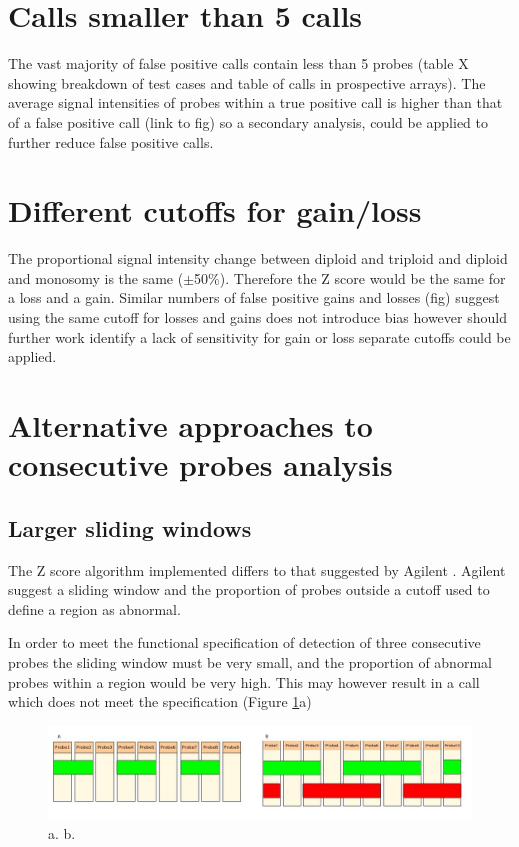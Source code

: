 \section{Calls smaller than 5 calls}
The vast majority of false positive calls contain less than 5 probes (table X showing breakdown of test cases and table of calls in prospective arrays). The average signal intensities of probes within a true positive call is higher than that of a false positive call (link to fig) so a secondary analysis, could be applied to further reduce false positive calls. 


\section{Different cutoffs for gain/loss}
The proportional signal intensity change between diploid and triploid and diploid and monosomy is the same ($\pm$50\%). Therefore the Z score would be the same for a loss and a gain. 
Similar numbers of false positive gains and losses (fig) suggest using the same cutoff for losses and gains does not introduce bias however should further work identify a lack of sensitivity for gain or loss separate cutoffs could be applied.

\section{Alternative approaches to consecutive probes analysis}
\subsection{Larger sliding windows}
The Z score algorithm implemented differs to that suggested by Agilent \cite{agilenttechnologies2012}. Agilent suggest a sliding window and the proportion of probes outside a cutoff used to define a region as abnormal.

In order to meet the functional specification of detection of three consecutive probes the sliding window must be very small, and the proportion of abnormal probes within a region would be very high. This may however result in a call which does not meet the specification (Figure \ref{fig:incorrectcallandalternatecomb}a)

\begin{figure}[h]
\centering
\includegraphics[width=1\linewidth]{./Figures/incorrectcallandalternatecomb}
\caption{a. b.}
\label{fig:incorrectcallandalternatecomb}
\end{figure}
